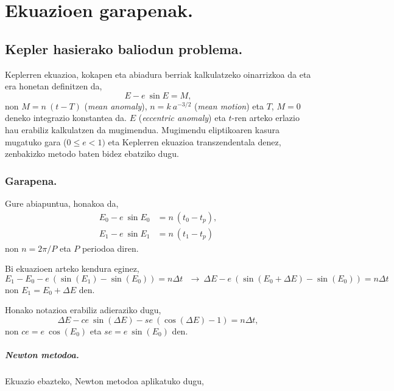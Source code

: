 \chapter{Ekuazioen garapenak.}
\label{eranskin:B}

\section{Kepler hasierako baliodun problema.}
\label{erans:B1}

Keplerren ekuazioa, kokapen eta abiadura berriak kalkulatzeko oinarrizkoa da eta era honetan definitzen da,
\begin{equation*}
E-e \ \sin E = M,
\end{equation*}
non $M=n \ (t-T)$ (\emph{mean anomaly}), $n=k \ a^{-3/2}$ (\emph{mean motion}) eta $T$, $M=0$ deneko integrazio konstantea da. $E$ (\emph{eccentric anomaly}) eta $t$-ren arteko erlazio hau erabiliz kalkulatzen da mugimendua. Mugimendu eliptikoaren kasura mugatuko gara ($0\leq e < 1)$ eta Keplerren ekuazioa transzendentala denez, zenbakizko metodo baten bidez ebatziko dugu.

\subsection*{Garapena.}

Gure abiapuntua, honakoa da,
\begin{align*}
E_0-e \ \sin E_0 & =n \ (t_0-t_p), \\
E_1-e \ \sin E_1 & =n \ (t_1-t_p)
\end{align*}
non $n=2\pi/P$ eta $P$ periodoa diren.

Bi ekuazioen arteko kendura eginez,
\begin{equation*}
E_1-E_0-e \ (\sin(E_1)-\sin(E_0))=n \Delta t \ \ \ \longrightarrow \ \Delta E - e \ (\sin(E_0+\Delta E)-\sin(E_0))=n \Delta t
\end{equation*}
non $E_1=E_0+\Delta E$ den.  

Honako notazioa erabiliz adieraziko dugu,
\begin{equation*}
\Delta E - ce \ \sin(\Delta E)- se \ (\cos(\Delta E)-1)=n \Delta t,
\end{equation*}
non $ce=e \ \cos(E_0)$ eta $se=e \ \sin(E_0)$ den.

\paragraph*{Newton metodoa.}Ekuazio ebazteko, Newton metodoa aplikatuko dugu,

